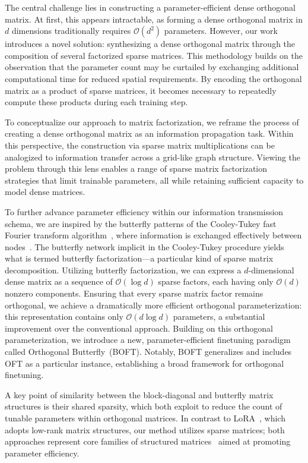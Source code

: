 The central challenge lies in constructing a parameter-efficient dense orthogonal matrix. At first, this appears intractable, as forming a dense orthogonal matrix in $d$ dimensions traditionally requires $\mathcal{O}(d^2)$ parameters. However, our work introduces a novel solution: synthesizing a dense orthogonal matrix through the composition of several factorized sparse matrices. This methodology builds on the observation that the parameter count may be curtailed by exchanging additional computational time for reduced spatial requirements. By encoding the orthogonal matrix as a product of sparse matrices, it becomes necessary to repeatedly compute these products during each training step. 

To conceptualize our approach to matrix factorization, we reframe the process of creating a dense orthogonal matrix as an information propagation task. Within this perspective, the construction via sparse matrix multiplications can be analogized to information transfer across a grid-like graph structure. Viewing the problem through this lens enables a range of sparse matrix factorization strategies that limit trainable parameters, all while retaining sufficient capacity to model dense matrices.

To further advance parameter efficiency within our information transmission schema, we are inspired by the butterfly patterns of the Cooley-Tukey fast Fourier transform algorithm~\cite{cooley1965algorithm}, where information is exchanged effectively between nodes~\cite{klasing1994broadcasting}. The butterfly network implicit in the Cooley-Tukey procedure yields what is termed butterfly factorization—a particular kind of sparse matrix decomposition. Utilizing butterfly factorization, we can express a $d$-dimensional dense matrix as a sequence of $\mathcal{O}(\log d)$ sparse factors, each having only $\mathcal{O}(d)$ nonzero components. Ensuring that every sparse matrix factor remains orthogonal, we achieve a dramatically more efficient orthogonal parameterization: this representation contains only $\mathcal{O}(d\log d)$ parameters, a substantial improvement over the conventional approach. Building on this orthogonal parameterization, we introduce a new, parameter-efficient finetuning paradigm called Orthogonal Butterfly~(BOFT). Notably, BOFT generalizes and includes OFT as a particular instance, establishing a broad framework for orthogonal finetuning. 

A key point of similarity between the block-diagonal and butterfly matrix structures is their shared sparsity, which both exploit to reduce the count of tunable parameters within orthogonal matrices. In contrast to LoRA~\cite{hulora2022}, which adopts low-rank matrix structures, our method utilizes sparse matrices; both approaches represent core families of structured matrices~\cite{candes2011robust} aimed at promoting parameter efficiency.

